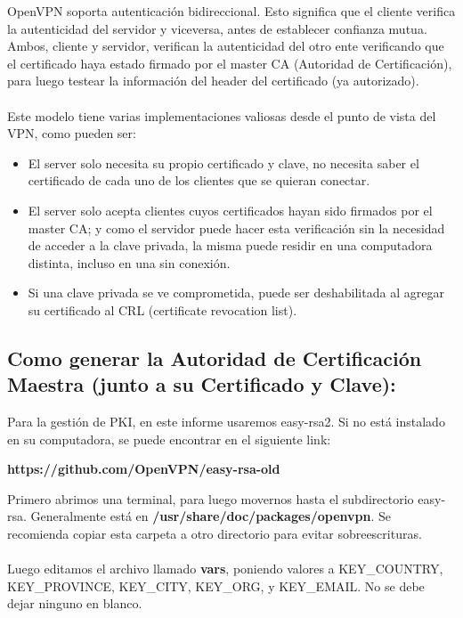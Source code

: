 \documentclass[a4paper, 12pt, usenames]{article}
\begin{document}
OpenVPN soporta autenticación bidireccional. Esto significa que el cliente verifica la autenticidad del servidor y viceversa, antes de establecer confianza mutua.\\
Ambos, cliente y servidor, verifican la autenticidad del otro ente verificando que el certificado haya estado firmado por el master CA (Autoridad de Certificación), para luego testear la información del header del certificado (ya autorizado).\\ \\
Este modelo tiene varias implementaciones valiosas desde el punto de vista del VPN, como pueden ser:

\begin{itemize}
\item El server solo necesita su propio certificado y clave, no necesita saber el certificado de cada uno de los clientes que se quieran conectar.
\item El server solo acepta clientes cuyos certificados hayan sido firmados por el master CA; y como el servidor puede hacer esta verificación sin la necesidad de acceder a la clave privada, la misma puede residir en una computadora distinta, incluso en una sin conexión.
\item Si una clave privada se ve comprometida, puede ser deshabilitada al agregar su certificado al CRL (certificate revocation list). \\
\end{itemize}

\subsection{Como generar la Autoridad de Certificación Maestra (junto a su Certificado y Clave):}
Para la gestión de PKI, en este informe usaremos easy-rsa2. Si no está instalado en su computadora, se puede encontrar en el siguiente link:
\begin{center}
\textbf{https://github.com/OpenVPN/easy-rsa-old}\\
\end{center}

Primero abrimos una terminal, para luego movernos hasta el subdirectorio easy-rsa. Generalmente está en \textbf{/usr/share/doc/packages/openvpn}. Se recomienda copiar esta carpeta a otro directorio para evitar sobreescrituras.\\ \\

Luego editamos el archivo llamado \textbf{vars}, poniendo valores a KEY\_COUNTRY, KEY\_PROVINCE, KEY\_CITY, KEY\_ORG, y KEY\_EMAIL. No se debe dejar ninguno en blanco.\\
\end{document}
